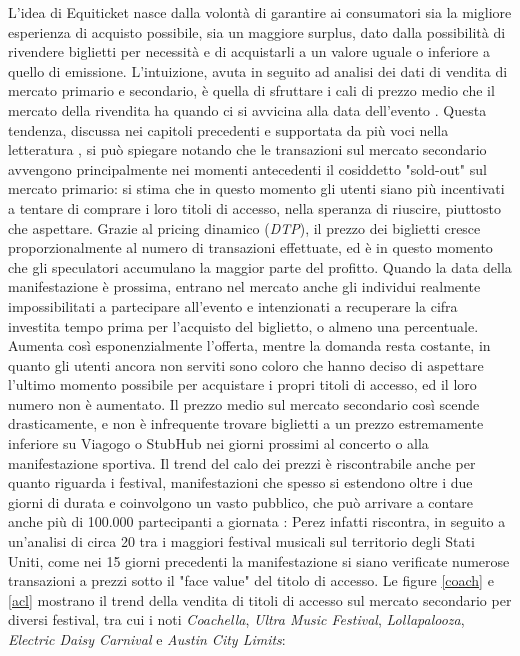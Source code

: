 L'idea di Equiticket nasce dalla volontà di garantire ai consumatori sia la migliore esperienza di acquisto possibile, sia un maggiore surplus, dato dalla possibilità di rivendere biglietti per necessità e di acquistarli a un valore uguale o inferiore a quello di emissione. L'intuizione, avuta in seguito ad analisi dei dati di vendita di mercato primario e secondario, è quella di sfruttare i cali di prezzo medio che il mercato della rivendita ha quando ci si avvicina alla data dell'evento \cite{hbrsecret}. 
Questa tendenza, discussa nei capitoli precedenti e supportata da più voci nella letteratura \cite{tompkins2018ticket, courty2017ticket}, si può spiegare notando che le transazioni sul mercato secondario avvengono principalmente nei momenti antecedenti il cosiddetto "sold-out" sul mercato primario: si stima che in questo momento gli utenti siano più incentivati a tentare di comprare i loro titoli di accesso, nella speranza di riuscire, piuttosto che aspettare. Grazie al pricing dinamico (\textit{DTP}), il prezzo dei biglietti cresce  proporzionalmente al numero di transazioni effettuate, ed è in questo momento che gli speculatori accumulano la maggior parte del profitto. Quando la data della manifestazione è prossima, entrano nel mercato anche gli individui realmente impossibilitati a partecipare all'evento e intenzionati a recuperare la cifra investita tempo prima per l'acquisto del biglietto, o almeno una percentuale. 
Aumenta così esponenzialmente l'offerta, mentre la domanda resta costante, in quanto gli utenti ancora non serviti sono coloro che hanno deciso di aspettare l'ultimo momento possibile per acquistare i propri titoli di accesso, ed il loro numero non è aumentato. 
Il prezzo medio sul mercato secondario così scende drasticamente, e non è infrequente trovare biglietti a un prezzo estremamente inferiore su Viagogo o StubHub nei giorni prossimi al concerto o alla manifestazione sportiva. Il trend del calo dei prezzi è riscontrabile anche per quanto riguarda i festival, manifestazioni che spesso si estendono oltre i due giorni di durata e coinvolgono un vasto pubblico, che può arrivare a contare anche più di 100.000 partecipanti a giornata \cite{perez2016music}: Perez infatti riscontra, in seguito a un'analisi di circa 20 tra i maggiori festival musicali sul territorio degli Stati Uniti, come nei 15 giorni precedenti la manifestazione si siano verificate numerose transazioni a prezzi sotto il "face value" del titolo di accesso. Le figure \ref{coach} e \ref{acl} mostrano il trend della vendita di titoli di accesso sul mercato secondario per diversi festival, tra cui i noti \textit{Coachella}, \textit{Ultra Music Festival}, \textit{Lollapalooza}, \textit{Electric Daisy Carnival} e \textit{Austin City Limits}: 
